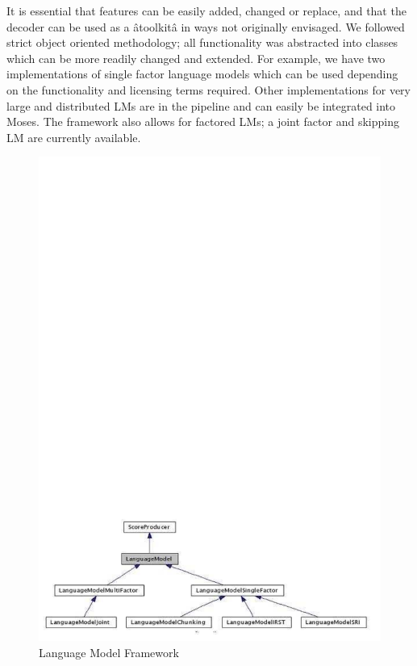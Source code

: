 \documentclass[11pt]{book}
\theoremstyle{plain}
\begin{document}
It is essential that features can be easily added, changed or replace, and that the decoder can be used as a âtoolkitâ in ways not originally envisaged. We followed strict object oriented methodology; all functionality was abstracted into classes which can be more readily changed and extended. For example, we have two implementations of single factor language models which can be used depending on the functionality and licensing terms required. Other implementations for very large and distributed LMs are in the pipeline and can easily be integrated into Moses. The framework also allows for factored LMs; a joint factor and skipping LM are currently available.\\

\begin{figure}[h]
\centering
\includegraphics[scale=0.2]{hieu-2}
\caption{Language Model Framework}
\end{figure}
\end{document}
